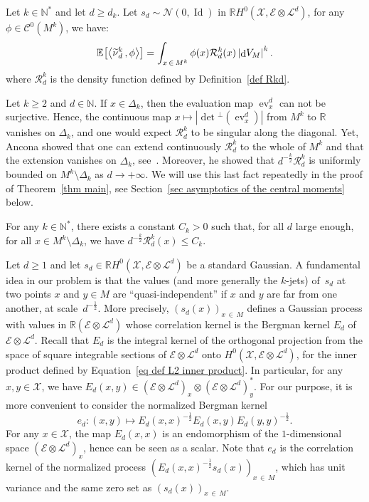 \documentclass[AHL,Unicode,longabstracts,published]{cedram}
\DeclareMathOperator{\dmesure}{d}
\DeclareMathOperator{\ev}{ev}
\DeclareMathOperator{\Id}{Id}
\newcommand{\E}{\mathcal{E}}
\newcommand{\X}{\mathcal{X}}
\renewcommand{\L}{\mathcal{L}}
\newcommand{\clN}{\mathcal{N}}
\newcommand{\clC}{\mathcal{C}}
\newcommand{\clR}{\mathcal{R}}
\newcommand{\N}{\mathbb{N}}
\newcommand{\R}{\mathbb{R}}
\newcommand{\esp}[2][]{\mathbb{E}_{#1}\!\left[#2 \right]}
\newcommand{\prsc}[2]{\left\langle #1\,, #2 \right\rangle}
\renewcommand{\H}{H^0(\X,\E \otimes \L^d)}
\renewcommand{\geq}{\geqslant}
\renewcommand{\leq}{\leqslant}
\renewcommand{\tilde}{\widetilde}
\let\oldtilde\tilde
\renewcommand*{\tilde}[1]{\mathchoice{\widetilde{#1}}{\widetilde{#1}}{\oldtilde{#1}}{\oldtilde{#1}}}
\begin{document}
\begin{prop}\label{prop Kac Rice}
Let $k \in \N^*$ and let $d \geq d_k$. Let $s_d \sim \clN(0,\Id)$ in $\R\H$, for any $\phi \in \clC^0(M^k)$, we have:
\[
\esp{\prsc{\tilde{\nu}_d^k}{\phi}} = \int_{x\,\in\,M^k} \phi(x) \clR^k_d(x) \left|\dmesure\! V_{M}\right|^k.
\]
where $\clR^k_d$ is the density function defined by Definition~\ref{def Rkd}.
\end{prop}

Let $k \geq 2$ and $d \in \N$. If $x \in \Delta_k$, then the evaluation map $\ev_x^d$ can not be surjective. Hence, the continuous map $x \mapsto |\det\!^\perp\!(\ev^d_x)|$ from $M^k$ to $\R$ vanishes on $\Delta_k$, and one would expect $\clR^k_d$ to be singular along the diagonal. Yet, Ancona showed that one can extend continuously $\clR^k_d$ to the whole of $M^k$ and that the extension vanishes on $\Delta_k$, see~\cite[Theorem~4.7]{Anc2019}. Moreover, he showed that $d^{-\frac{k}{2}}\clR^k_d$ is uniformly bounded on $M^k \setminus \Delta_k$ as $d \to +\infty$. We will use this last fact repeatedly in the proof of Theorem~\ref{thm main}, see Section~\ref{sec asymptotics of the central moments} below.

\begin{prop}\label{prop bounded density}
For any $k\in \N^*$, there exists a constant $C_k >0$ such that, for all $d$ large enough, for all $x \in M^k \setminus \Delta_k$, we have $d^{-\frac{k}{2}}\clR^k_d(x)\leq C_k$.
\end{prop}

Let $d \geq 1$ and let $s_d \in \R\H$ be a standard Gaussian. A fundamental idea in our problem is that the values (and more generally the $k$-jets) of~$s_d$ at two points $x$ and $y \in M$ are ``quasi-independent'' if $x$ and $y$ are far from one another, at scale~$d^{-\frac{1}{2}}$. More precisely, $(s_d(x))_{x\,\in\,M}$ defines a Gaussian process with values in $\R(\E \otimes \L^d)$ whose correlation kernel is the Bergman kernel $E_d$ of $\E \otimes \L^d$. Recall that $E_d$ is the integral kernel of the orthogonal projection from the space of square integrable sections of $\E \otimes \L^d$ onto $\H$, for the inner product defined by Equation~\eqref{eq def L2 inner product}. In particular, for any $x,y \in \X$, we have $E_d(x,y) \in (\E \otimes \L^d)_x \otimes (\E \otimes \L^d)^*_y$. For our purpose, it is more convenient to consider the normalized Bergman kernel
\[
e_d:(x,y) \mapsto E_d(x,x)^{-\frac{1}{2}}E_d(x,y)E_d(y,y)^{-\frac{1}{2}}.
\]
For any $x \in \X$, the map $E_d(x,x)$ is an endomorphism of the $1$-dimensional space $(\E \otimes \L^d)_x$, hence can be seen as a scalar. Note that $e_d$ is the correlation kernel of the normalized process $(E_d(x,x)^{-\frac{1}{2}}s_d(x))_{x\,\in\,M}$, which has unit variance and the same zero set as $(s_d(x))_{x\,\in\,M}$.
\end{document}
